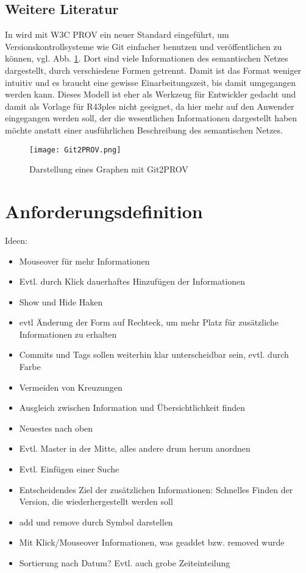 \documentclass[color]{tudbook}
\begin{document}
\section{Weitere Literatur}
\label{sec:WeitereLiteratur}
In \cite{Git2PROV} wird mit W3C PROV ein neuer Standard eingeführt, um Versionskontrollsysteme wie Git einfacher benutzen und veröffentlichen zu können, vgl. Abb. \ref{fig:Git2PROV}. Dort sind viele Informationen des semantischen Netzes dargestellt, durch verschiedene Formen getrennt. Damit ist das Format weniger intuitiv und es braucht eine gewisse Einarbeitungszeit, bis damit umgegangen werden kann. Dieses Modell ist eher als Werkzeug für Entwickler gedacht und damit als Vorlage für R43ples nicht geeignet, da hier mehr auf den Anwender eingegangen werden soll, der die wesentlichen Informationen dargestellt haben möchte anstatt einer ausführlichen Beschreibung des semantischen Netzes.

\begin{figure}[htbp] 
  \centering
     \texttt{[image: Git2PROV.png]}
  \caption{Darstellung eines Graphen mit Git2PROV}
  \label{fig:Git2PROV}
\end{figure}

\chapter{Anforderungsdefinition}
Ideen:
\begin{itemize}
\item Mouseover für mehr Informationen
\item Evtl. durch Klick dauerhaftes Hinzufügen der Informationen
\item Show und Hide Haken
\item evtl Änderung der Form auf Rechteck, um mehr Platz für zusätzliche Informationen zu erhalten
\item Commits und Tags sollen weiterhin klar unterscheidbar sein, evtl. durch Farbe
\item Vermeiden von Kreuzungen
\item Ausgleich zwischen Information und Übersichtlichkeit finden
\item Neuestes nach oben
\item Evtl. Master in der Mitte, alles andere drum herum anordnen
\item Evtl. Einfügen einer Suche
\item Entscheidendes Ziel der zusätzlichen Informationen: Schnelles Finden der Version, die wiederhergestellt werden soll
\item add und remove durch Symbol darstellen
\item Mit Klick/Mouseover Informationen, was geaddet bzw. removed wurde
\item Sortierung nach Datum? Evtl. auch grobe Zeiteinteilung
\end{itemize}
\end{document}
